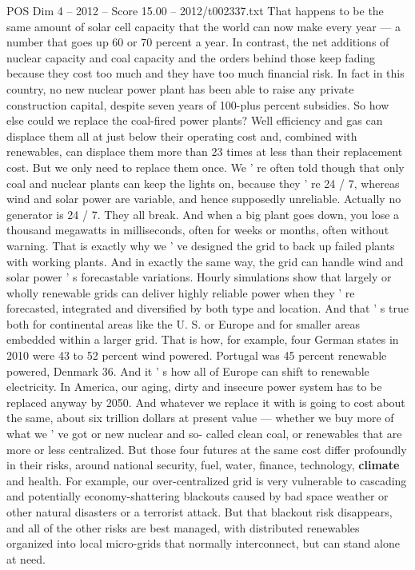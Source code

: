 \begin{textsample}{POS Dim 4 – 2012 – Score 15.00 – 2012/t002337.txt}
That happens to be the same amount of solar cell capacity that the world can now make every year — a number that goes up 60 or 70 percent a year.
In contrast, the net additions of nuclear capacity and coal capacity and the orders behind those keep fading because they cost too much and they have too much financial risk.
In fact in this country, no new nuclear power plant has been able to raise any private construction capital, despite seven years of 100-plus percent subsidies.
So how else could we replace the coal-fired power plants?
Well efficiency and gas can displace them all at just below their operating cost and, combined with renewables, can displace them more than 23 times at less than their replacement cost.
But we only need to replace them once.
We ' re often told though that only coal and nuclear plants can keep the lights on, because they ' re 24 / 7, whereas wind and solar power are variable, and hence supposedly unreliable.
Actually no generator is 24 / 7.
They all break.
And when a big plant goes down, you lose a thousand megawatts in milliseconds, often for weeks or months, often without warning.
That is exactly why we ' ve designed the grid to back up failed plants with working plants.
And in exactly the same way, the grid can handle wind and solar power ' s forecastable variations.
Hourly simulations show that largely or wholly renewable grids can deliver highly reliable power when they ' re forecasted, integrated and diversified by both type and location.
And that ' s true both for continental areas like the U.
S. or Europe and for smaller areas embedded within a larger grid.
That is how, for example, four German states in 2010 were 43 to 52 percent wind powered.
Portugal was 45 percent renewable powered, Denmark 36.
And it ' s how all of Europe can shift to renewable electricity.
In America, our aging, dirty and insecure power system has to be replaced anyway by 2050.
And whatever we replace it with is going to cost about the same, about six trillion dollars at present value — whether we buy more of what we ' ve got or new nuclear and so- called clean coal, or renewables that are more or less centralized.
But those four futures at the same cost differ profoundly in their risks, around national security, fuel, water, finance, technology, \textbf{climate} and health.
For example, our over-centralized grid is very vulnerable to cascading and potentially economy-shattering blackouts caused by bad space weather or other natural disasters or a terrorist attack.
But that blackout risk disappears, and all of the other risks are best managed, with distributed renewables organized into local micro-grids that normally interconnect, but can stand alone at need.

\end{textsample}

